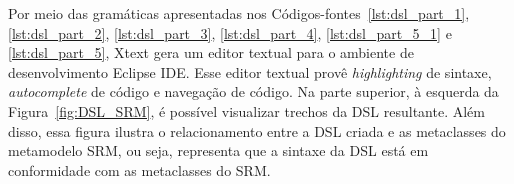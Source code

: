 


Por meio das gramáticas apresentadas nos Códigos-fontes~\ref{lst:dsl_part_1}, \ref{lst:dsl_part_2}, \ref{lst:dsl_part_3}, \ref{lst:dsl_part_4}, \ref{lst:dsl_part_5_1} e \ref{lst:dsl_part_5}, Xtext gera um editor textual para o ambiente de desenvolvimento Eclipse IDE. Esse editor textual provê \textit{highlighting} de sintaxe, \textit{autocomplete} de código e navegação de código. Na parte superior, à esquerda da Figura~\ref{fig:DSL_SRM}, é possível visualizar trechos da DSL resultante. Além disso, essa figura ilustra o relacionamento entre a DSL criada e as metaclasses do metamodelo SRM, ou seja, representa que a sintaxe da DSL está em conformidade com as metaclasses do SRM.

